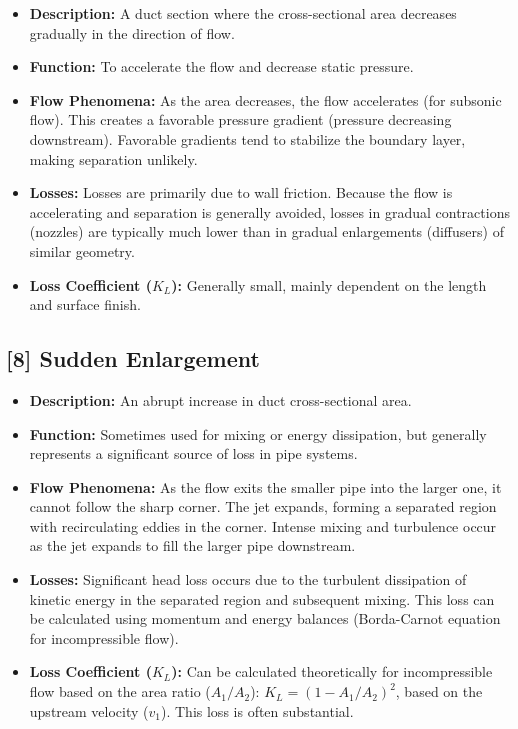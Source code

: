 \begin{itemize}
\tightlist
\item
  \textbf{Description:} A duct section where the cross-sectional area
  decreases gradually in the direction of flow.
\item
  \textbf{Function:} To accelerate the flow and decrease static
  pressure.
\item
  \textbf{Flow Phenomena:} As the area decreases, the flow accelerates
  (for subsonic flow). This creates a favorable pressure gradient
  (pressure decreasing downstream). Favorable gradients tend to
  stabilize the boundary layer, making separation unlikely.
\item
  \textbf{Losses:} Losses are primarily due to wall friction. Because
  the flow is accelerating and separation is generally avoided, losses
  in gradual contractions (nozzles) are typically much lower than in
  gradual enlargements (diffusers) of similar geometry.
\item
  \textbf{Loss Coefficient (\(K_L\)):} Generally small, mainly dependent
  on the length and surface finish.
\end{itemize}

\hypertarget{sudden-enlargement}{%
\subsection{{[}8{]} Sudden Enlargement}\label{sudden-enlargement}}

\begin{itemize}
\tightlist
\item
  \textbf{Description:} An abrupt increase in duct cross-sectional area.
\item
  \textbf{Function:} Sometimes used for mixing or energy dissipation,
  but generally represents a significant source of loss in pipe systems.
\item
  \textbf{Flow Phenomena:} As the flow exits the smaller pipe into the
  larger one, it cannot follow the sharp corner. The jet expands,
  forming a separated region with recirculating eddies in the corner.
  Intense mixing and turbulence occur as the jet expands to fill the
  larger pipe downstream.
\item
  \textbf{Losses:} Significant head loss occurs due to the turbulent
  dissipation of kinetic energy in the separated region and subsequent
  mixing. This loss can be calculated using momentum and energy balances
  (Borda-Carnot equation for incompressible flow).
\item
  \textbf{Loss Coefficient (\(K_L\)):} Can be calculated theoretically
  for incompressible flow based on the area ratio (\(A_1/A_2\)):
  \(K_L = (1 - A_1/A_2)^2\), based on the upstream velocity (\(v_1\)).
  This loss is often substantial.
\end{itemize}

